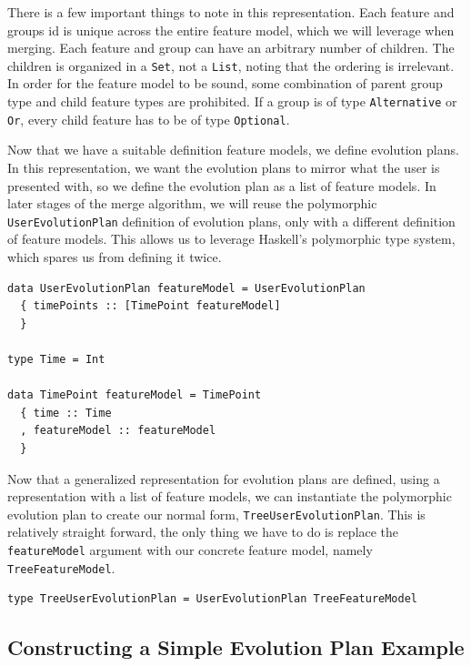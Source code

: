 \documentclass[a4paper,english]{ifimaster}
\begin{document}
There is a few important things to note in this representation. Each feature and groups id is unique across the entire feature model, which we will leverage when merging. Each feature and group can have an arbitrary number of children. The children is organized in a \texttt{Set}, not a \texttt{List}, noting that the ordering is irrelevant. In order for the feature model to be sound, some combination of parent group type and child feature types are prohibited. If a group is of type \texttt{Alternative} or \texttt{Or}, every child feature has to be of type \texttt{Optional}.

Now that we have a suitable definition feature models, we define evolution plans. In this representation, we want the evolution plans to mirror what the user is presented with, so we define the evolution plan as a list of feature models. In later stages of the merge algorithm, we will reuse the polymorphic \texttt{User\-Evolution\-Plan} definition of evolution plans, only with a different definition of feature models. This allows us to leverage Haskell's polymorphic type system, which spares us from defining it twice.

\begin{verbatim}
data UserEvolutionPlan featureModel = UserEvolutionPlan
  { timePoints :: [TimePoint featureModel]
  }

type Time = Int

data TimePoint featureModel = TimePoint
  { time :: Time
  , featureModel :: featureModel
  }
\end{verbatim}

Now that a generalized representation for evolution plans are defined, using a representation with a list of feature models, we can instantiate the polymorphic evolution plan to create our normal form, \texttt{Tree\-User\-Evolution\-Plan}. This is relatively straight forward, the only thing we have to do is replace the \texttt{featureModel} argument with our concrete feature model, namely \texttt{Tree\-Feature\-Model}.

\begin{verbatim}
type TreeUserEvolutionPlan = UserEvolutionPlan TreeFeatureModel
\end{verbatim}

\subsection{Constructing a Simple Evolution Plan Example}%
\label{sub:constructing_a_simple_evolution_plan_example}
\end{document}
